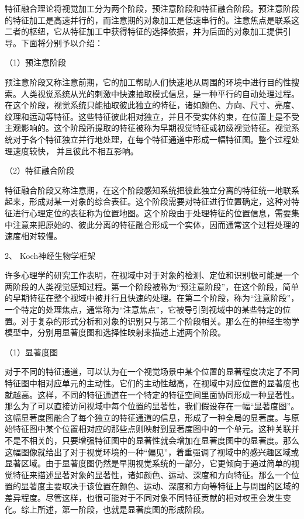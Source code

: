 \documentclass[a4paper,12pt]{article}
\begin{document}
特征融合理论将视觉加工分为两个阶段，预注意阶段和特征融合阶段。预注意阶段的特征加工是高速并行的，而注意期的对象加工是低速串行的。注意焦点是联系这二者的枢纽，它从特征加工中获得特征的选择依据，并为后面的对象加工提供引导。下面将分别予以介绍：


（1）预注意阶段

预注意阶段又称注意前期，它的加工帮助人们快速地从周围的环境中进行目的性搜索。人类视觉系统从光的刺激中快速抽取模式信息，是一种平行的自动处理过程。在这个阶段，视觉系统只能抽取彼此独立的特征，诸如颜色、方向、尺寸、亮度、纹理和运动等特征。这些特征彼此相对独立，并且不受实体约束，在位置上是不受主观影响的。这个阶段所提取的特征被称为早期视觉特征或初级视觉特征。视觉系统对于各个特征独立并行地处理，在每个特征通道中形成一幅特征图。整个过程处理速度较快，
并且彼此不相互影响。

（2）特征融合阶段

特征融合阶段又称注意期，在这个阶段感知系统把彼此独立分离的特征统一地联系起来，形成对某一对象的综合表征。这个阶段需要对特征进行位置确定，这种对特征进行心理定位的表征称为位置地图。这个阶段由于处理特征的位置信息，需要集中注意来把原始的、彼此分离的特征融合形成一个实体，因而通常这个过程处理的速度相对较慢。



2、 Koch神经生物学框架



许多心理学的研究工作表明，在视域中对于对象的检测、定位和识别极可能是一个两阶段的人类视觉感知过程。第一个阶段被称为“预注意阶段”，在这个阶段，简单的早期特征在整个视域中被并行且快速的处理。在第二个阶段，称为“注意阶段”，一个特定的处理焦点，通常称为“注意焦点”，它被导引到视域中的某些特定的位置。对于复杂的形式分析和对象的识别只与第二个阶段相关。那么在的神经生物学模型中，分别用显著度图和选择性映射来描述上述两个阶段。

（1）显著度图

对于不同的特征通道，可以认为在一个视觉场景中某个位置的显著程度决定了不同特征图中相对应单元的主动性。它们的主动性越高，在视域中对应位置的显著度也就越高。这样，不同的特征通道在一个特定的特征空间里面协同形成一种显著性。那么为了可以直接访问视域中每个位置的显著性，我们假设存在一幅“显著度图”。这幅显著度图融合了每个独立的特征通道的信息，形成了一种全局的显著度。与原始特征图中某个位置相对应的那些点则映射到显著度图中的一个单元。这种关联并不是不相关的，只要增强特征图中的显著性就会增加在显著度图中的显著度。那么这幅图像就给出了对于视觉环境的一种“偏见”，着重强调了视域中的感兴趣区域或显著区域。由于显著度图仍然是早期视觉系统的一部分，它更倾向于通过简单的视觉特征来描述显著对象的显著性，诸如颜色、运动、深度和方向特征。那么一个位置的显著度主要取决于该位置在颜色、运动、深度和方向等特征上与周围的区域的差异程度。尽管这样，也很可能对于不同对象不同特征贡献的相对权重会发生变化。综上所述，第一阶段，也就是显著度图的形成阶段。
\end{document}
